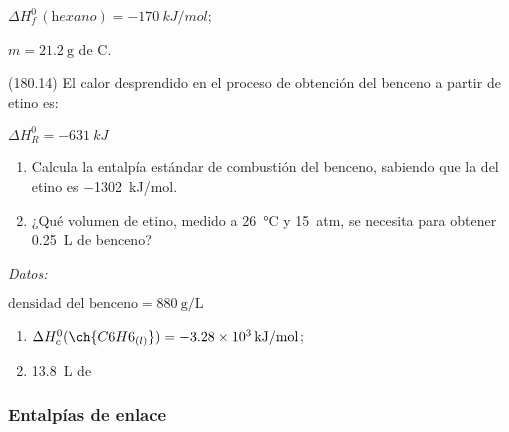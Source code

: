 \documentclass[10pt,a5paper,twoside]{article}
\newenvironment{gexdatos}{
      \vspace{4pt}
      \noindent\small\textit{Datos:}
    }{\vspace{5pt}}
\begin{document}
  \begin{solution}
    \begin{enumerate*}
      \item \( \Delta H^0_f\,(\textit{hexano}) = \SI{-170}{kJ/mol} \);
      \item \( m = \SI{21.2}{\gram} \) de C.
    \end{enumerate*}
  \end{solution}




  \begin{exercise}[
      tags    = {},
      topics  = {química, termodinámica, termoquímica},
      source  = {FQ 1B MGH 2016, p180, e14},
    ]
    (180.14) El calor desprendido en el proceso de obtención del benceno a partir de etino es:

     \( \Delta H^0_R = \SI{-631}{kJ} \)

    \begin{enumerate}
      \item Calcula la entalpía estándar de combustión del benceno, sabiendo que la del etino es \SI{-1302}{kJ/mol}.
      \item ¿Qué volumen de etino, medido a \SI{26}{\celsius} y \SI{15}{atm}, se necesita para obtener \SI{0.25}{\liter} de benceno?
    \end{enumerate}

    \begin{gexdatos}
      \( \textrm{densidad del benceno} = \SI{880}{\gram\per\liter} \)
    \end{gexdatos}
  \end{exercise}

  \begin{solution}
    \begin{enumerate}
      \item \( \Delta H^0_c (\ch{C6H6_{(l)}}) = \SI{-3.28e3}{kJ/mol} \); \item \SI{13.8}{\liter} de 
    \end{enumerate}
  \end{solution}






  \subsubsection*{Entalpías de enlace}
\end{document}
